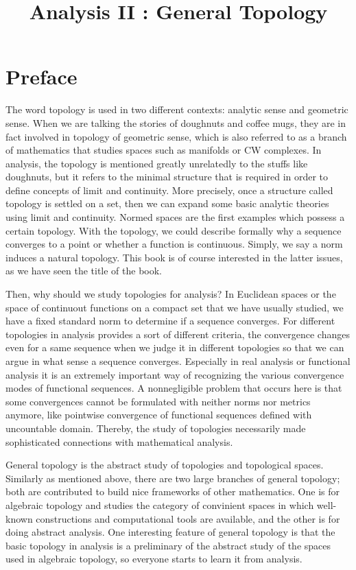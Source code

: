 \documentclass{../crs}
\title{Analysis II : General Topology}
\begin{document}
\maketitle
\tableofcontents

\frontmatter


\chapter*{Preface}

The word topology is used in two different contexts: analytic sense and geometric sense.
When we are talking the stories of doughnuts and coffee mugs, they are in fact involved in topology of geometric sense, which is also referred to as a branch of mathematics that studies spaces such as manifolds or CW complexes.
In analysis, the topology is mentioned greatly unrelatedly to the stuffs like doughnuts, but it refers to the minimal structure that is required in order to define concepts of limit and continuity.
More precisely, once a structure called topology is settled on a set, then we can expand some basic analytic theories using limit and continuity.
Normed spaces are the first examples which possess a certain topology.
With the topology, we could describe formally why a sequence converges to a point or whether a function is continuous.
Simply, we say a norm induces a natural topology.
This book is of course interested in the latter issues, as we have seen the title of the book.

Then, why should we study topologies for analysis? 
In Euclidean spaces or the space of continuout functions on a compact set that we have usually studied, we have a fixed standard norm to determine if a sequence converges.
For different topologies in analysis provides a sort of different criteria, the convergence changes even for a same sequence when we judge it in different topologies so that we can argue in what sense a sequence converges.
Especially in real analysis or functional analysis it is an extremely important way of recognizing the various convergence modes of functional sequences.
A nonnegligible problem that occurs here is that some convergences cannot be formulated with neither norms nor metrics anymore, like pointwise convergence of functional sequences defined with uncountable domain.
Thereby, the study of topologies necessarily made sophisticated connections with mathematical analysis.

General topology is the abstract study of topologies and topological spaces.
Similarly as mentioned above, there are two large branches of general topology; both are contributed to build nice frameworks of other mathematics.
One is for algebraic topology and studies the category of convinient spaces in which well-known constructions and computational tools are available, and the other is for doing abstract analysis.
One interesting feature of general topology is that the basic topology in analysis is a preliminary of the abstract study of the spaces used in algebraic topology, so everyone starts to learn it from analysis.
\end{document}
